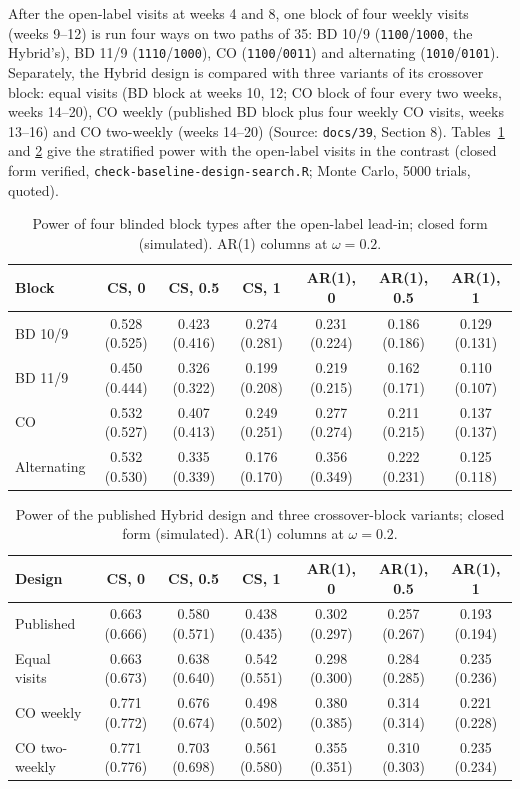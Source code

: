 \documentclass[11pt]{article}
\newcommand{\code}[1]{\texttt{#1}}
\begin{document}
After the open-label visits at weeks 4 and 8, one block of four weekly
visits (weeks 9--12) is run four ways on two paths of 35: BD 10/9
(\code{1100}/\code{1000}, the Hybrid's), BD 11/9 (\code{1110}/\code{1000}),
CO (\code{1100}/\code{0011}) and alternating (\code{1010}/\code{0101}).
Separately, the Hybrid design is compared with three variants of its
crossover block: equal visits (BD block at weeks 10, 12; CO block of four
every two weeks, weeks 14--20), CO weekly (published BD block plus four
weekly CO visits, weeks 13--16) and CO two-weekly (weeks 14--20)
(Source: \code{docs/39}, Section 8). Tables~\ref{tab:invf-blk1} and
\ref{tab:invf-blk2} give the stratified power with the open-label visits
in the contrast (closed form verified, \code{check-baseline-design-search.R}; Monte
Carlo, 5000 trials, quoted).

\begin{table}[h]
\centering\small
\caption{Power of four blinded block types after the open-label lead-in;
closed form (simulated). AR(1) columns at $\omega = 0.2$.}
\label{tab:invf-blk1}
\footnotesize\setlength{\tabcolsep}{3pt}
\begin{tabular}{@{}lcccccc@{}}
\toprule
Block & CS, 0 & CS, 0.5 & CS, 1 & AR(1), 0 & AR(1), 0.5 & AR(1), 1 \\
\midrule
BD 10/9 & 0.528 (0.525) & 0.423 (0.416) & 0.274 (0.281) & 0.231 (0.224) & 0.186 (0.186) & 0.129 (0.131) \\
BD 11/9 & 0.450 (0.444) & 0.326 (0.322) & 0.199 (0.208) & 0.219 (0.215) & 0.162 (0.171) & 0.110 (0.107) \\
CO & 0.532 (0.527) & 0.407 (0.413) & 0.249 (0.251) & 0.277 (0.274) & 0.211 (0.215) & 0.137 (0.137) \\
Alternating & 0.532 (0.530) & 0.335 (0.339) & 0.176 (0.170) & 0.356 (0.349) & 0.222 (0.231) & 0.125 (0.118) \\
\bottomrule
\end{tabular}
\end{table}

\begin{table}[h]
\centering\small
\caption{Power of the published Hybrid design and three crossover-block
variants; closed form (simulated). AR(1) columns at $\omega = 0.2$.}
\label{tab:invf-blk2}
\footnotesize\setlength{\tabcolsep}{3pt}
\begin{tabular}{@{}lcccccc@{}}
\toprule
Design & CS, 0 & CS, 0.5 & CS, 1 & AR(1), 0 & AR(1), 0.5 & AR(1), 1 \\
\midrule
Published & 0.663 (0.666) & 0.580 (0.571) & 0.438 (0.435) & 0.302 (0.297) & 0.257 (0.267) & 0.193 (0.194) \\
Equal visits & 0.663 (0.673) & 0.638 (0.640) & 0.542 (0.551) & 0.298 (0.300) & 0.284 (0.285) & 0.235 (0.236) \\
CO weekly & 0.771 (0.772) & 0.676 (0.674) & 0.498 (0.502) & 0.380 (0.385) & 0.314 (0.314) & 0.221 (0.228) \\
CO two-weekly & 0.771 (0.776) & 0.703 (0.698) & 0.561 (0.580) & 0.355 (0.351) & 0.310 (0.303) & 0.235 (0.234) \\
\bottomrule
\end{tabular}
\end{table}
\end{document}
